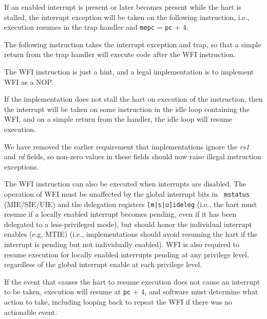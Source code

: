If an enabled interrupt is present or later becomes present while the
hart is stalled, the interrupt exception will be taken on the
following instruction, i.e., execution resumes in the trap handler and
{\tt mepc} = {\tt pc} + 4.

\begin{commentary}
The following instruction takes the interrupt exception and trap, so
that a simple return from the trap handler will execute code after the
WFI instruction.
\end{commentary}

The WFI instruction is just a hint, and a legal implementation is to
implement WFI as a NOP.

\begin{commentary}
If the implementation does not stall the hart on execution of the
instruction, then the interrupt will be taken on some instruction in
the idle loop containing the WFI, and on a simple return from the
handler, the idle loop will resume execution.
\end{commentary}

\begin{commentary}
We have removed the earlier requirement that implementations ignore
the {\em rs1} and {\em rd} fields, so non-zero values in these fields
should now raise illegal instruction exceptions.
\end{commentary}

The WFI instruction can also be executed when interrupts are disabled.  The
operation of WFI must be unaffected by the global interrupt bits in {\tt
mstatus} (MIE/SIE/UIE) and the delegation registers {\tt [m|s|u]ideleg}
(i.e., the hart must resume if a locally enabled interrupt becomes pending,
even if it has been delegated to a less-privileged mode), but should honor the
individual interrupt enables (e.g, MTIE) (i.e., implementations should
avoid resuming the hart if the interrupt is pending but not
individually enabled).  WFI is also required to resume execution for
locally enabled interrupts pending at any privilege level, regardless
of the global interrupt enable at each privilege level.

If the event that causes the hart to resume execution does not cause
an interrupt to be taken, execution will resume at {\tt pc} + 4, and
software must determine what action to take, including looping back to
repeat the WFI if there was no actionable event.

